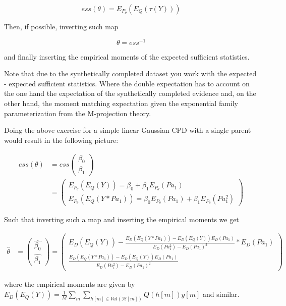 \documentclass[11pt]{article}
\begin{document}
\begin{article}
$$ess(\theta) = E_{P_\theta}(E_Q(\tau(Y)))$$

Then, if possible, inverting such map

$$\theta = ess^{-1}$$

and finally inserting the empirical moments of the expected
sufficient statistics.

Note that due to the synthetically completed dataset you work with
the expected - expected sufficient statistics. Where the double
expectation has to account on the one hand the expectation of the
synthetically completed evidence and, on the other hand, the moment
matching expectation given the exponential family parameterization
from the M-projection theory.

Doing the above exercise for a simple linear Gaussian CPD with a
single parent would result in the following picture:

 \begin{align*}
 ess (\theta) &= ess\begin{pmatrix}
                 \beta_0\\
		 \beta_1
		 \end{pmatrix} \\
		 &= \begin{pmatrix}
		 E_{P_\theta}(E_Q(Y)) = \beta_0 + \beta_1 E_{P_\theta}(Pa_1) \\
		 E_{P_\theta}(E_Q(Y * Pa_1)) = \beta_0 E_{P_\theta}(Pa_1) + \beta_1 E_{P_\theta}(Pa_1^2)
		 \end{pmatrix}
\end{align*}


Such that inverting such a map and inserting the empirical moments
we get

 \begin{align}
 \hat{\theta} &= \begin{pmatrix}
                 \hat{\beta_0}\\
		 \hat{\beta_1}
           \end{pmatrix} 
        = \begin{pmatrix}
		 E_D(E_Q(Y)) - \frac{E_D(E_Q(Y*Pa_1))- E_D(E_Q(Y))E_D(Pa_1)}{E_D(Pa_1^2) - E_D(Pa_1)^2} * E_D(Pa_1)\\
		 \frac{E_D(E_Q(Y*Pa_1))- E_D(E_Q(Y))E_D(Pa_1)}{E_D(Pa_1^2) - E_D(Pa_1)^2}
           \end{pmatrix}
\end{align}

where the empirical moments are given by \(E_D(E_Q(Y)) = \frac{1}{M}
    \sum_m \sum_{h[m] \in Val(\mathscr{H}[m])} Q(h[m]) y[m]\) and
similar.    


\end{article}
\end{document}
